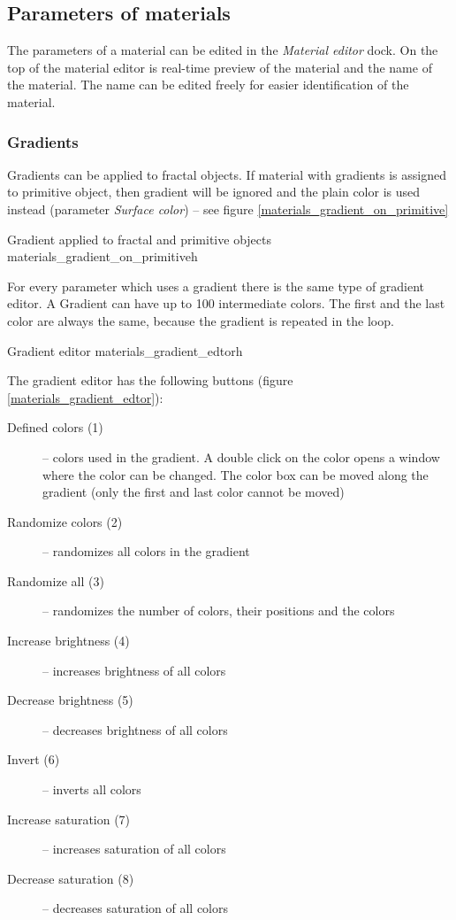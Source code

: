 \subsection{Parameters of materials}\label{materials-parameters}

The parameters of a material can be edited in the \emph{Material editor} dock. On the top of the material editor is real-time preview of the material and the name of the material. The name can be edited freely for easier identification of the material.

\subsubsection{Gradients}\label{materials-gradients}

Gradients can be applied to fractal objects. If material with gradients is assigned to primitive object, then gradient will be ignored and the plain color is used instead (parameter \emph{Surface color}) -- see figure \ref{materials_gradient_on_primitive}

{Gradient applied to fractal and primitive objects}
{materials_gradient_on_primitive}{h}

For every parameter which uses a gradient there is the same type of gradient editor. A Gradient can have up to 100 intermediate colors. The first and the last color are always the same, because the gradient is repeated in the loop.

{Gradient editor}
{materials_gradient_edtor}{h}

The gradient editor has the following buttons (figure \ref{materials_gradient_edtor}):
\nopagebreak
\begin{description}
	\item[Defined colors (1)] -- colors used in the gradient. A double click on the color opens a window where the color can be changed. The color box can be moved along the gradient (only the first and last color cannot be moved)
	\item[Randomize colors (2)] -- randomizes all colors in the gradient
	\item[Randomize all (3)] -- randomizes the number of colors, their positions and the colors
	\item[Increase brightness (4)] -- increases brightness of all colors
	\item[Decrease brightness (5)] -- decreases brightness of all colors
	\item[Invert (6)] -- inverts all colors
	\item[Increase saturation (7)] -- increases saturation of all colors
	\item[Decrease saturation (8)] -- decreases saturation of all colors
\end{description}


